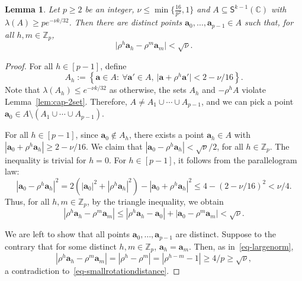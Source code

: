 \documentclass[10pt,a4paper]{article}
\newcommand{\V}[1]{\mathbold{#1}}
\newtheorem{lemma}[theorem]{Lemma}
\theoremstyle{definition}
\newcommand{\sS}{\mathsf{S}}
\newcommand{\sC}{\mathbb{C}}
\newcommand{\sZ}{\mathbb{Z}}
\newcommand*{\bigabs}[1]{\bigl|#1\bigr|}
\begin{document}
\begin{lemma}\label{lem-closebyrotations}
	Let $p\ge 2$ be an integer, $\nu\le \min\{\frac{16}{p^2},1\}$ and $A\subseteq \sS^{k-1}(\sC)$ with $\lambda(A)\ge pe^{-\nu k/32}$. Then there are distinct points $\V{a}_0,\ldots,\V{a}_{p-1}\in A$ such that, for all $h,m\in \sZ_p$,
	$$\bigabs{\rho^h\V{a}_h-\rho^m\V{a}_m}<\sqrt{\nu}.$$
\end{lemma}
\begin{proof}
	For all $h\in [p-1]$, define 
	$$
	A_h:=\left\{\V{a}\in A:~\forall \V{a}'\in A,~\bigabs{\V{a}+\rho^h\V{a}'}< 2-\nu/16 \right\}.
	$$
	Note that $\lambda(A_h)\le e^{-\nu k/32}$ as otherwise, the sets $A_h$ and $-\rho^hA$ violate Lemma~\ref{lem:cap-2set}. Therefore, $A\neq A_1\cup\cdots\cup A_{p-1}$, and we can pick a point $\V{a}_0\in A\setminus(A_1\cup\cdots\cup A_{p-1})$. 
	
	For all $h\in [p-1]$, since $\V{a}_0\notin A_h$, there exists a point $\V{a}_h\in A$
	with  $|\V{a}_0+\rho^h\V{a}_h|\ge 2-\nu/16$. We claim that $|\V{a}_0-\rho^h\V{a}_h|<\sqrt{\nu}/2$, for all $h\in \sZ_p$. The inequality is trivial for $h=0$. For $h\in [p-1]$, it follows from the parallelogram law:
	\begin{equation*}
		|\V{a}_0-\rho^h\V{a}_h|^2=  2(|\V{a}_0|^2+|\rho^h\V{a}_h|^2)-|\V{a}_0+\rho^h\V{a}_h|^2\le 4-(2-\nu/16)^2<\nu/4.
	\end{equation*}
	Thus, for all $h,m\in \sZ_p$, by the triangle inequality, we obtain
	\begin{equation}\label{eq-smallrotationdistance}
		|\rho^h\V{a}_h-\rho^m\V{a}_m|\le|\rho^h\V{a}_h-\V{a}_0|+|\V{a}_0-\rho^m\V{a}_m|<\sqrt{\nu}.
	\end{equation}

	We are left to show that all points $\V{a}_0,\ldots, \V{a}_{p-1}$ are distinct. Suppose to the contrary that for some distinct $h,m\in \sZ_p$, $\V{a}_h=\V{a}_m$. Then, as in~\eqref{eq-largenorm},
	\begin{equation*}
		|\rho^h\V{a}_h-\rho^m\V{a}_m|=|\rho^h-\rho^m|=|\rho^{h-m}-1|\ge  4/p\ge \sqrt{\nu},
	\end{equation*}   
	a contradiction to~\eqref{eq-smallrotationdistance}.
\end{proof}
\end{document}
